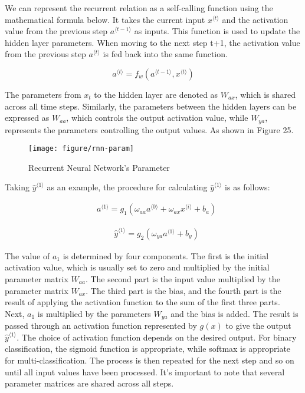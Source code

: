 \documentclass{article}
\begin{document}
We can represent the recurrent relation as a self-calling function using the mathematical formula below. It takes the current input $x^{\langle t\rangle}$ and the activation value from the previous step $a^{\langle {t-1}\rangle}$ as inputs. This function is used to update the hidden layer parameters. When moving to the next step t+1, the activation value from the previous step $a^{\langle t\rangle}$ is fed back into the same function.

\begin{equation}
a^{\langle t\rangle}=f_w\left(a^{\langle {t-1}\rangle}, x^{\langle t\rangle}\right)
\end{equation}

The parameters from $x_t$ to the hidden layer are denoted as $W_{ax}$, which is shared across all time steps. Similarly, the parameters between the hidden layers can be expressed as $W_{aa}$, which controls the output activation value, while  $W_{ya}$, represents the parameters controlling the output values. As shown in Figure 25.


\begin{figure}[htbp]
        \centering
        \texttt{[image: figure/rnn-param]}
        \caption{Recurrent Neural Network's Parameter}
     \end{figure}


Taking ${\hat{y}}^{\langle 1\rangle}$ as an example, the procedure for calculating ${\hat{y}}^{\langle 1\rangle}$ is as follows:

\begin{equation}
\begin{aligned} & a^{\langle 1\rangle}=g_1\left(\omega_{a a} a^{\langle 0\rangle}+\omega_{a x} x^{\langle i\rangle}+b_a\right)\end{aligned}
\end{equation}

\begin{equation}
\begin{aligned} & {\hat{y}}^{\langle 1\rangle}=g_2\left(\omega_{y a} a^{\langle 1\rangle}+b_y\right) \end{aligned}
\end{equation}


The value of $a_1$ is determined by four components. The first is the initial activation value, which is usually set to zero and multiplied by the initial parameter matrix $W_{aa}$. The second part is the input value multiplied by the parameter matrix $W_{ax}$. The third part is the bias, and the fourth part is the result of applying the activation function to the sum of the first three parts. Next, $a_1$ is multiplied by the parameters $W_{ya}$ and the bias is added. The result is passed through an activation function represented by $g(x)$ to give the output ${\hat{y}}^{\langle 1\rangle}$. The choice of activation function depends on the desired output. For binary classification, the sigmoid function is appropriate, while softmax is appropriate for multi-classification. The process is then repeated for the next step and so on until all input values have been processed. It's important to note that several parameter matrices are shared across all steps.
\end{document}
